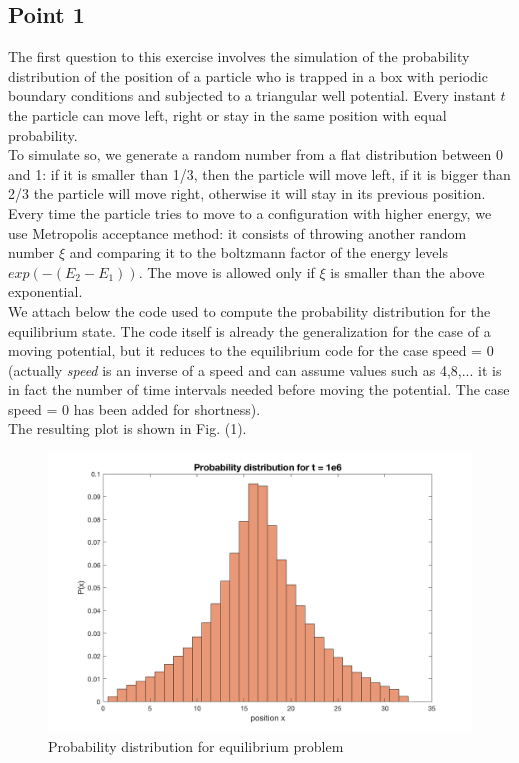 \documentclass[11pt,letterpaper]{article}
\begin{document}
\subsection{Point 1}
The first question to this exercise involves the simulation of the probability distribution of the position of a particle who is trapped in a box with periodic boundary conditions and subjected to a triangular well potential. Every instant $t$ the particle can move left, right or stay in the same position with equal probability.\\
 To simulate so, we generate a random number from a flat distribution between 0 and 1: if it is smaller than 1/3, then the particle will move left, if it is bigger than 2/3 the particle will move right, otherwise it will stay in its previous position. Every time the particle tries to move to a configuration with higher energy, we use Metropolis acceptance method: it consists of throwing another random number $\xi$ and comparing it to the boltzmann factor of the energy levels $exp(-(E_2 - E_1))$. The move is allowed only if $\xi$ is smaller than the above exponential.\\

We attach below the code used to compute the probability distribution for the equilibrium state. The code itself is already the generalization for the case of a moving potential, but it reduces to the equilibrium code for the case speed = 0 (actually \textit{speed} is an inverse of a speed and can assume values such as 4,8,... it is in fact the number of time intervals needed before moving the potential. The case speed = 0 has been added for shortness).\\


The resulting plot is shown in Fig. (1).

\begin{figure}
\centering
\includegraphics[width=0.9\linewidth]{./prob_equi}
\caption{Probability distribution for equilibrium problem}
\label{fig:prob_equi}
\end{figure}
\end{document}

